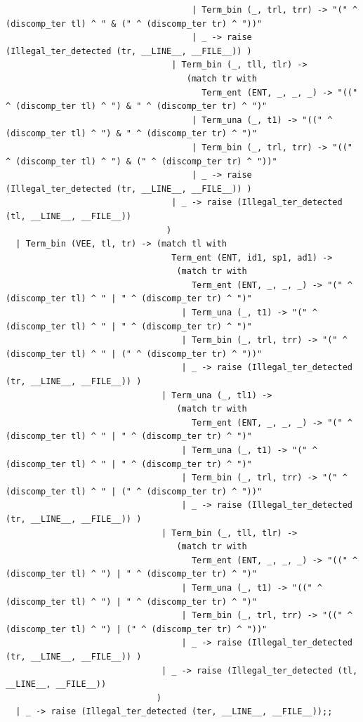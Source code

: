 \documentclass[12pt]{article}
\begin{document}
\begin{tiny}
\begin{verbatim}
                                     | Term_bin (_, trl, trr) -> "(" ^ (discomp_ter tl) ^ " & (" ^ (discomp_ter tr) ^ "))"
                                     | _ -> raise (Illegal_ter_detected (tr, __LINE__, __FILE__)) )
                                 | Term_bin (_, tll, tlr) ->
                                    (match tr with
                                       Term_ent (ENT, _, _, _) -> "((" ^ (discomp_ter tl) ^ ") & " ^ (discomp_ter tr) ^ ")"
                                     | Term_una (_, t1) -> "((" ^ (discomp_ter tl) ^ ") & " ^ (discomp_ter tr) ^ ")"
                                     | Term_bin (_, trl, trr) -> "((" ^ (discomp_ter tl) ^ ") & (" ^ (discomp_ter tr) ^ "))"
                                     | _ -> raise (Illegal_ter_detected (tr, __LINE__, __FILE__)) )
                                 | _ -> raise (Illegal_ter_detected (tl, __LINE__, __FILE__))
                                )
  | Term_bin (VEE, tl, tr) -> (match tl with
                                 Term_ent (ENT, id1, sp1, ad1) ->
                                  (match tr with
                                     Term_ent (ENT, _, _, _) -> "(" ^ (discomp_ter tl) ^ " | " ^ (discomp_ter tr) ^ ")"
                                   | Term_una (_, t1) -> "(" ^ (discomp_ter tl) ^ " | " ^ (discomp_ter tr) ^ ")"
                                   | Term_bin (_, trl, trr) -> "(" ^ (discomp_ter tl) ^ " | (" ^ (discomp_ter tr) ^ "))"
                                   | _ -> raise (Illegal_ter_detected (tr, __LINE__, __FILE__)) )
                               | Term_una (_, tl1) ->
                                  (match tr with
                                     Term_ent (ENT, _, _, _) -> "(" ^ (discomp_ter tl) ^ " | " ^ (discomp_ter tr) ^ ")"
                                   | Term_una (_, t1) -> "(" ^ (discomp_ter tl) ^ " | " ^ (discomp_ter tr) ^ ")"
                                   | Term_bin (_, trl, trr) -> "(" ^ (discomp_ter tl) ^ " | (" ^ (discomp_ter tr) ^ "))"
                                   | _ -> raise (Illegal_ter_detected (tr, __LINE__, __FILE__)) )
                               | Term_bin (_, tll, tlr) ->
                                  (match tr with
                                     Term_ent (ENT, _, _, _) -> "((" ^ (discomp_ter tl) ^ ") | " ^ (discomp_ter tr) ^ ")"
                                   | Term_una (_, t1) -> "((" ^ (discomp_ter tl) ^ ") | " ^ (discomp_ter tr) ^ ")"
                                   | Term_bin (_, trl, trr) -> "((" ^ (discomp_ter tl) ^ ") | (" ^ (discomp_ter tr) ^ "))"
                                   | _ -> raise (Illegal_ter_detected (tr, __LINE__, __FILE__)) )
                               | _ -> raise (Illegal_ter_detected (tl, __LINE__, __FILE__))
                              )
  | _ -> raise (Illegal_ter_detected (ter, __LINE__, __FILE__));;



\end{verbatim}
\end{tiny}
\end{document}
